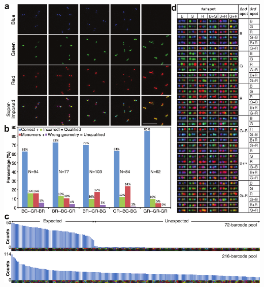\begin{FPfigure} %
\includegraphics[width=\textwidth]{figures/dna3}
\caption[Dual-labeled-zone fluorescent barcodes.]{Dual-labeled-zone fluorescent barcodes. (\textbf{a}) Typical TIRF microscopy images 
of five selected barcode species, shown both in separate channels and after 
superimposing. Scale bar: 5 \textmu m. (\textbf{b}) Statistics obtained by analyzing two 50×50 \textmu m$^2$ 
images of each barcode species (\textasciitilde85 barcodes, the exact sample size N is noted beside 
the corresponding bar-graph). The barcode types are noted under the x-axis of the 
diagram. Color scheme (unrelated to the pseudo-colors of the fluorophores): blue, correct 
barcodes (correct geometry and color identity); green, incorrect barcodes (correct 
geometry but incorrect color identity); red, monomer nanotubes (one spot or two 
connecting spots); and purple, barcodes with wrong geometry (i.e., bending angle <120°, 
see methods in SI). (\textbf{c}) Computer-aided barcode counting results of the 72-barcode pool 
(N=2,617) and the 216-barcode pool (N=7,243) plotted as bar-graphs with descending 
barcode counts from left to right (see Supplementary Tables S.1.6 and S.1.7 for the numeric counting results). 
A computer-generated reference barcode image is placed underneath the corresponding 
bar. (\textbf{d}) A table containing one representative TIRF image (1.4×0.7 \textmu m$^2$) for each of the 
216 dual-labeled-zone barcode species. 
\label{fig:dna3}}
\end{FPfigure}
\afterpage{\clearpage}



